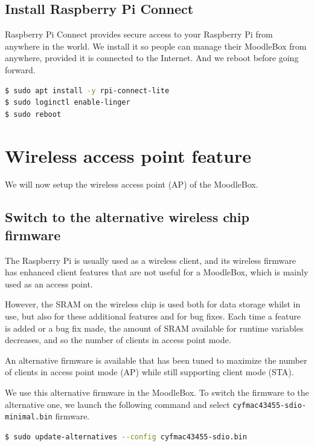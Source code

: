 \documentclass[12pt]{article}
\begin{document}
\subsection{Install Raspberry Pi Connect}

Raspberry Pi Connect provides secure access to your Raspberry Pi from anywhere in the world.
We install it so people can manage their MoodleBox from anywhere, provided it is connected to the Internet.
And we reboot before going forward.

\begin{lstlisting}[language=bash]
$ sudo apt install -y rpi-connect-lite
$ sudo loginctl enable-linger
$ sudo reboot
\end{lstlisting}

\section{Wireless access point feature}

We will now setup the wireless access point (AP) of the MoodleBox.

\subsection{Switch to the alternative wireless chip firmware}

The Raspberry Pi is usually used as a wireless client, and its wireless firmware has enhanced client features that are not useful for a MoodleBox, which is mainly used as an access point.

However, the SRAM on the wireless chip is used both for data storage whilst in use, but also for these additional features and for bug fixes.
Each time a feature is added or a bug fix made, the amount of SRAM available for runtime variables decreases, and so the number of clients in access point mode.

An alternative firmware is available that has been tuned to maximize the number of clients in access point mode (AP) while still supporting client mode (STA).

We use this alternative firmware in the MoodleBox.
To switch the firmware to the alternative one, we launch the following command and select \lstinline{cyfmac43455-sdio-minimal.bin} firmware.

\begin{lstlisting}[language=bash]
$ sudo update-alternatives --config cyfmac43455-sdio.bin
\end{lstlisting}
\end{document}
